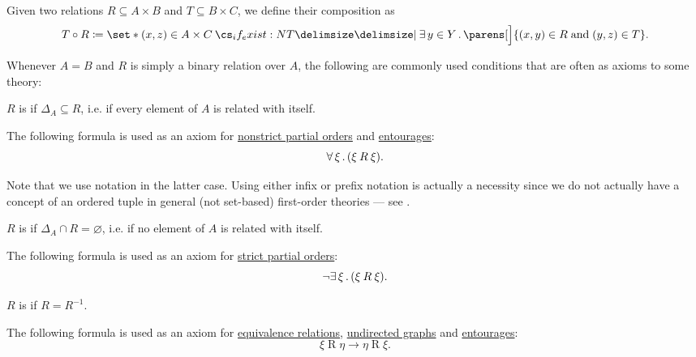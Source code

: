 \begin{definition}
\begin{thmenum}[series=def:binary_relation]
     Given two relations \( R \subseteq A \times B \) and \( T \subseteq B \times C \), we define their composition as
    \begin{equation*}
      T \bincirc R \coloneqq \set*{ (x, z) \in A \times C \given* \qexists {y \in Y} \parens[\Big]{ (x, y) \in R \T{and} (y, z) \in T } }.
    \end{equation*}
  \end{thmenum}

  Whenever \( A = B \) and \( R \) is simply a binary relation over \( A \), the following are commonly used conditions that are often as axioms to some theory:
  \begin{thmenum}[resume=def:binary_relation]
     \( R \) is  if \( \Delta_A \subseteq R \), i.e. if every element of \( A \) is related with itself.

    The following formula is used as an axiom for \hyperref[def:partially_ordered_set/nonstrict]{nonstrict partial orders} and \hyperref[def:entourage]{entourages}:
    \begin{equation}\label{eq:def:binary_relation/reflexive}
      \forall \thinspace \xi \thinspace . \thinspace (\xi \mathbin{R} \xi).
    \end{equation}

    Note that we use  notation in the latter case. Using either infix or prefix notation is actually a necessity since we do not actually have a concept of an ordered tuple in general (not set-based) first-order theories --- see .

     \( R \) is  if \( \Delta_A \cap R = \varnothing \), i.e. if no element of \( A \) is related with itself.

    The following formula is used as an axiom for \hyperref[def:partially_ordered_set/strict]{strict partial orders}:
    \begin{equation}\label{eq:def:binary_relation/irreflexive}
      \neg \exists \thinspace \xi \thinspace . \thinspace (\xi \mathbin{R} \xi).
    \end{equation}

     \( R \) is  if \( R = R^{-1} \).

    The following formula is used as an axiom for \hyperref[def:equivalence_relation]{equivalence relations}, \hyperref[def:undirected_graph]{undirected graphs} and \hyperref[def:entourage]{entourages}:
    \begin{equation}\label{eq:def:binary_relation/symmetric}
      \xi \mathbin{R} \eta \rightarrow \eta \mathbin{R} \xi.
    \end{equation}


\end{thmenum}
\end{definition}

